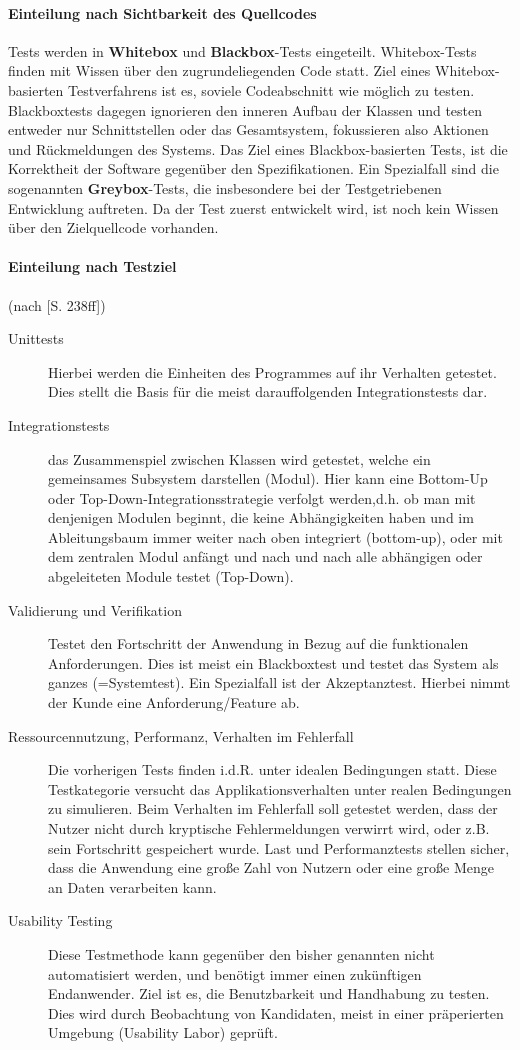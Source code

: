 \paragraph{Einteilung nach Sichtbarkeit des Quellcodes} Tests werden in \textbf{Whitebox} und \textbf{Blackbox}-Tests eingeteilt. 
Whitebox-Tests finden mit Wissen über den zugrundeliegenden Code statt. Ziel eines Whitebox-basierten Testverfahrens ist es, soviele Codeabschnitt wie möglich zu testen. Blackboxtests dagegen ignorieren den inneren Aufbau der Klassen und testen entweder nur Schnittstellen oder das Gesamtsystem, fokussieren also Aktionen und Rückmeldungen des Systems. Das Ziel eines Blackbox-basierten Tests, ist die Korrektheit der Software gegenüber den Spezifikationen.
Ein Spezialfall sind die sogenannten \textbf{Greybox}-Tests, die insbesondere bei der Testgetriebenen Entwicklung auftreten. Da der Test zuerst entwickelt wird, ist noch kein Wissen über den Zielquellcode vorhanden.

\paragraph{Einteilung nach Testziel} (nach \cite{hunt_pragmatic_1999}[S. 238ff])
\begin{description}
 \item[Unittests] Hierbei werden die Einheiten des Programmes auf ihr Verhalten getestet. Dies stellt die Basis für die meist darauffolgenden Integrationstests dar.
 \item[Integrationstests]  das Zusammenspiel zwischen Klassen wird getestet, welche ein gemeinsames Subsystem darstellen (Modul). Hier kann eine Bottom-Up oder Top-Down-Integrationsstrategie verfolgt werden,d.h. ob man mit denjenigen Modulen beginnt, die keine Abhängigkeiten haben und im Ableitungsbaum immer weiter nach oben integriert (bottom-up), oder mit dem zentralen Modul anfängt und nach und nach alle abhängigen oder abgeleiteten Module testet (Top-Down).
 \item[Validierung und Verifikation] Testet den Fortschritt der Anwendung in Bezug auf die funktionalen Anforderungen. Dies ist meist ein Blackboxtest und testet das System als ganzes (=Systemtest). Ein Spezialfall ist der Akzeptanztest. Hierbei nimmt der Kunde eine Anforderung/Feature ab.
 \item[Ressourcennutzung, Performanz, Verhalten im Fehlerfall] Die vorherigen Tests finden i.d.R. unter idealen Bedingungen statt. Diese Testkategorie versucht das Applikationsverhalten unter realen Bedingungen zu simulieren. Beim Verhalten im Fehlerfall soll getestet werden, dass der Nutzer nicht durch kryptische Fehlermeldungen verwirrt wird, oder z.B. sein Fortschritt gespeichert wurde. Last und Performanztests stellen sicher, dass die Anwendung eine große Zahl von Nutzern oder eine große Menge an Daten verarbeiten kann.
 \item[Usability Testing] Diese Testmethode kann gegenüber den bisher genannten nicht automatisiert werden, und benötigt immer einen zukünftigen Endanwender. Ziel ist es, die Benutzbarkeit und Handhabung zu testen. Dies wird durch Beobachtung von Kandidaten, meist in einer präperierten Umgebung (Usability Labor) geprüft.
\end{description}


